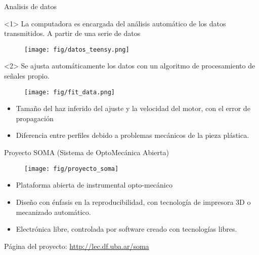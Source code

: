 \begin{frame}{Analisis de datos}

\begin{onlyenv}<1>
La computadora es encargada del análisis automático de los datos transmitidos. A partir de una serie de datos
\begin{figure}[H]
\centering
\texttt{[image: fig/datos\_teensy.png]}
\label{fig:data_teensy}
\end{figure}
\end{onlyenv}
%
\begin{onlyenv}<2>
Se ajusta automáticamente los datos con un algoritmo de procesamiento de señales propio.
\\
\begin{minipage}[c]{0.5\textwidth}
\begin{figure}[H]
\centering
\texttt{[image: fig/fit\_data.png]}
\label{fig:fit_data}
\end{figure}
\end{minipage}
%
\begin{minipage}[c]{0.45\textwidth}
\begin{itemize}
\item Tamaño del haz inferido del ajuste y la velocidad del motor, con el error de propagación
\item Diferencia entre perfiles debido a problemas mecánicos de la pieza plástica. 
\end{itemize}
\end{minipage}
%
\end{onlyenv}

\end{frame}


\begin{frame}[t,fragile]{Proyecto SOMA (Sistema de OptoMecánica Abierta)}

\centering

\begin{figure}[H]
\centering
\texttt{[image: fig/proyecto\_soma]}
\label{fig:soma}
\end{figure}

\begin{itemize}
\item Plataforma abierta de instrumental opto-mecánico
\item Diseño con énfasis en la reproducibilidad, con tecnología de impresora 3D o mecanizado automático.
\item Electrónica libre, controlada por software creado con tecnologías libres.
\end{itemize}

Página del proyecto: \url{http://lec.df.uba.ar/soma}

\end{frame}

